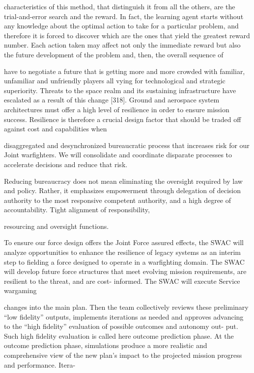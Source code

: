 \documentclass[a4paper,12pt]{article}
\begin{document}
characteristics of this method, that distinguish it from all the others, are the
trial-and-error search and the reward. In fact, the learning agent starts without
any knowledge about the optimal action to take for a particular problem, and
therefore it is forced to discover which are the ones that yield the greatest reward
number. Each action taken may affect not only the immediate reward but
also the future development of the problem and, then, the overall sequence of

have to negotiate a future that is getting more and more crowded with 
familiar, unfamiliar and unfriendly players all vying for technological 
and strategic superiority. Threats to the space realm and its sustaining 
infrastructure have escalated as a result of this change [318]. Ground 
and aerospace system architectures must offer a high level of resilience 
in order to ensure mission success. Resilience is therefore a crucial 
design factor that should be traded off against cost and capabilities when

disaggregated and desynchronized bureaucratic process 
that increases risk for our Joint warfighters. We will 
consolidate and coordinate disparate processes to 
accelerate decisions and reduce that risk. 
 
Reducing bureaucracy does not mean eliminating the 
oversight required by law and policy. Rather, it emphasizes 
empowerment through delegation of decision authority to 
the most responsive competent authority, and a high 
degree of accountability. Tight alignment of responsibility,

resourcing and oversight functions. 
 
To ensure our force design offers the Joint Force 
assured effects, the SWAC will analyze opportunities 
to enhance the resilience of legacy systems as an 
interim step to fielding a force designed to operate in 
a warfighting domain. The SWAC will develop future 
force 
structures 
that 
meet 
evolving 
mission 
requirements, are resilient to the threat, and are cost-
informed. The SWAC will execute Service wargaming

changes into the main plan.
Then the team collectively
reviews these preliminary “low ﬁdelity” outputs, implements
iterations as needed and approves advancing to the “high
ﬁdelity” evaluation of possible outcomes and autonomy out-
put.
Such high ﬁdelity evaluation is called here outcome
prediction phase.
At the outcome prediction phase, simulations produce a more
realistic and comprehensive view of the new plan’s impact
to the projected mission progress and performance. Itera-
\end{document}
